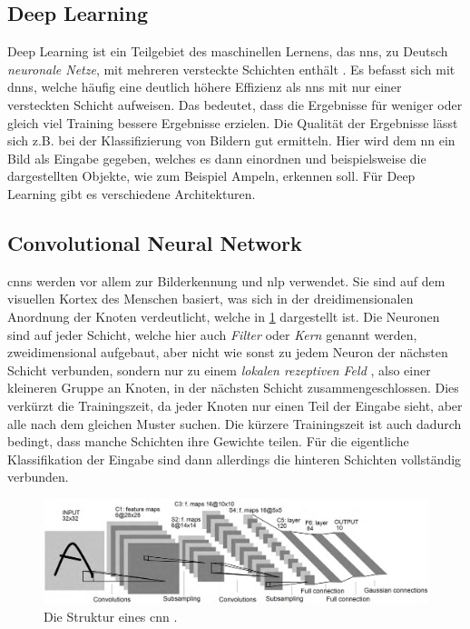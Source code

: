 \subsection{Deep Learning}
Deep Learning ist ein Teilgebiet des maschinellen Lernens, das \acp{nn}, zu Deutsch \emph{neuronale Netze}, mit mehreren versteckte Schichten enthält \citep{deeplearningreview}.
Es befasst sich mit \acp{dnn}, welche häufig eine deutlich höhere Effizienz als \acp{nn} mit nur einer versteckten Schicht aufweisen.
Das bedeutet, dass die Ergebnisse für weniger oder gleich viel Training bessere Ergebnisse erzielen.
Die Qualität der Ergebnisse lässt sich z.B. bei der Klassifizierung von Bildern gut ermitteln.
Hier wird dem \ac{nn} ein Bild als Eingabe gegeben, welches es dann einordnen und beispielsweise die dargestellten Objekte, wie zum Beispiel Ampeln, erkennen soll.
Für Deep Learning gibt es verschiedene Architekturen.

\subsection{Convolutional Neural Network}
\acp{cnn} werden vor allem zur Bilderkennung und \ac{nlp} verwendet.
Sie sind auf dem visuellen Kortex des Menschen basiert, was sich in der dreidimensionalen Anordnung der Knoten verdeutlicht,
welche in \cref{fig:struktur-cnn} dargestellt ist.
Die Neuronen sind auf jeder Schicht, welche hier auch \emph{Filter} oder \emph{Kern} genannt werden,
zweidimensional aufgebaut, aber nicht wie sonst zu jedem Neuron der nächsten Schicht verbunden,
sondern nur zu einem \emph{lokalen rezeptiven Feld} \citep{deeplearningnature},
also einer kleineren Gruppe an Knoten, in der nächsten Schicht zusammengeschlossen.
Dies verkürzt die Trainingszeit, da jeder Knoten nur einen Teil der Eingabe sieht, aber alle nach dem gleichen Muster suchen.
Die kürzere Trainingszeit ist auch dadurch bedingt, dass manche Schichten ihre Gewichte teilen.
Für die eigentliche Klassifikation der Eingabe sind dann allerdings die hinteren Schichten vollständig verbunden.
\begin{figure}%
\centering
\includegraphics[width=\textwidth, height=\textheight, keepaspectratio]{Images/CNN.png}
\caption[Struktur von CNNs]{Die Struktur eines \ac{cnn} \citep{deeplearningarchitecturesreview}.}
\label{fig:struktur-cnn}
\end{figure}


